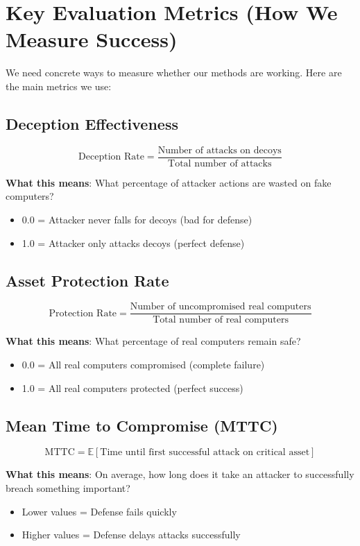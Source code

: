\documentclass[11pt]{article}
\begin{document}
\section{Key Evaluation Metrics (How We Measure Success)}

\begin{foundation}
We need concrete ways to measure whether our methods are working. Here are the main metrics we use:
\end{foundation}

\subsection{Deception Effectiveness}
\begin{mathdetails}
$$\text{Deception Rate} = \frac{\text{Number of attacks on decoys}}{\text{Total number of attacks}}$$

\textbf{What this means}: What percentage of attacker actions are wasted on fake computers?
\begin{itemize}
\item 0.0 = Attacker never falls for decoys (bad for defense)
\item 1.0 = Attacker only attacks decoys (perfect defense)
\end{itemize}
\end{mathdetails}

\subsection{Asset Protection Rate}
\begin{mathdetails}
$$\text{Protection Rate} = \frac{\text{Number of uncompromised real computers}}{\text{Total number of real computers}}$$

\textbf{What this means}: What percentage of real computers remain safe?
\begin{itemize}
\item 0.0 = All real computers compromised (complete failure)
\item 1.0 = All real computers protected (perfect success)
\end{itemize}
\end{mathdetails}

\subsection{Mean Time to Compromise (MTTC)}
\begin{mathdetails}
$$\text{MTTC} = \mathbb{E}[\text{Time until first successful attack on critical asset}]$$

\textbf{What this means}: On average, how long does it take an attacker to successfully breach something important?
\begin{itemize}
\item Lower values = Defense fails quickly
\item Higher values = Defense delays attacks successfully
\end{itemize}
\end{mathdetails}
\end{document}
